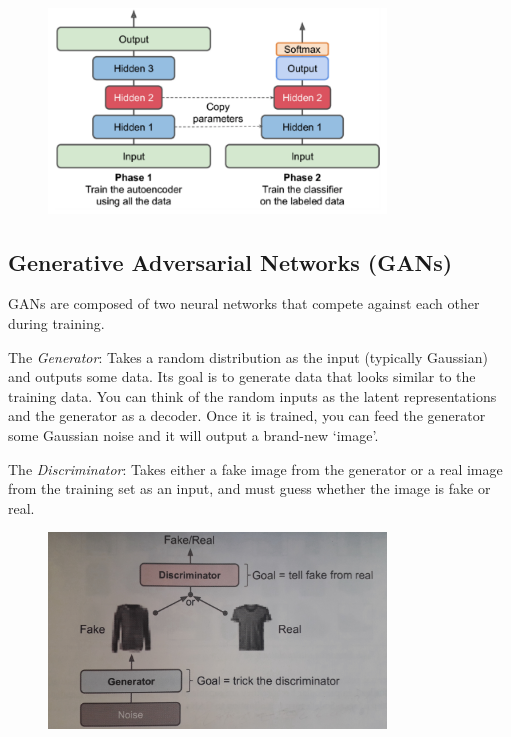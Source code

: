 \begin{figure}[ht]
\centering
\includegraphics[width=0.80\textwidth]{./images/unsupervised_pretraining.png}
\end{figure}

\subsection{Generative Adversarial Networks (GANs)}

GANs are composed of two neural networks that compete against each other during training.

The \textit{Generator}:\newline
Takes a random distribution as the input (typically Gaussian) and outputs some data.
Its goal is to generate data that looks similar to the training data.
You can think of the random inputs as the latent representations and the generator as a decoder.
Once it is trained, you can feed the generator some Gaussian noise and it will output a brand-new `image'.

The \textit{Discriminator}:\newline
Takes either a fake image from the generator or a real image from the training set as an input,
and must guess whether the image is fake or real.\newline

\begin{figure}[ht]
\centering
\includegraphics[width=0.80\textwidth]{./images/gan.jpg}
\end{figure}



\newpage